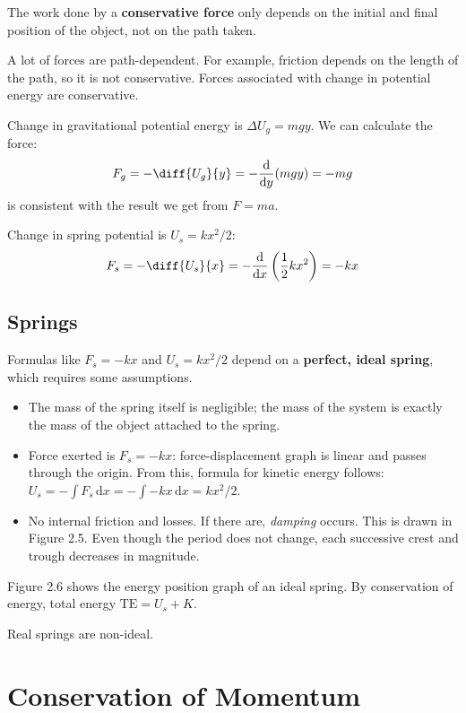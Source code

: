 \documentclass{article}
\newcommand{\definition}[1]{\begin{tcolorbox}[colback=red!5!white,colframe=red!75!black,parbox=false] #1 \end{tcolorbox}}
\newcommand{\example}[2]{\begin{tcolorbox}[title={Example: #1},colback=brown!5!white,colframe=brown!75!black,parbox=false] #2 \end{tcolorbox}}
\newcommand*{\deriv}[1][x]{\ensuremath{\dfrac{\mathrm{d}}{\mathrm{d}#1}}}
\begin{document}
\definition{The work done by a \textbf{conservative force} only depends on the initial and final position of the object, not on the path taken.}

A lot of forces are path-dependent. For example, friction depends on the length of the path, so it is not conservative. Forces associated with change in potential energy are conservative.

\example{Gravitational potential}{
	Change in gravitational potential energy is $\Delta U_g=mgy$. We can calculate the force:
	\begin{equation*}
		F_g=-\diff{U_g}{y}=-\deriv[y](mgy)=-mg
	\end{equation*}
	is consistent with the result we get from $F=ma$.
}

\example{Spring potential}{
	Change in spring potential is $U_s=kx^2/2$:
	\begin{equation*}
		F_s=-\diff{U_s}{x}=-\deriv[x]\left(\frac12kx^2\right)=-kx
	\end{equation*}
}

\subsection{Springs}

Formulas like $F_s=-kx$ and $U_s=kx^2/2$ depend on a \textbf{perfect, ideal spring}, which requires some assumptions.
\begin{itemize}
	\item The mass of the spring itself is negligible; the mass of the system is exactly the mass of the object attached to the spring.
	\item Force exerted is $F_s=-kx$: force-displacement graph is linear and passes through the origin. From this, formula for kinetic energy follows: $U_s=-\int F_s\,\mathrm{d}x=-\int -kx\,\mathrm{d}x=kx^2/2$.
	\item No internal friction and losses. If there are, \textit{damping} occurs. This is drawn in Figure 2.5. Even though the period does not change, each successive crest and trough decreases in magnitude.
\end{itemize}

Figure 2.6 shows the energy position graph of an ideal spring. By conservation of energy, total energy $\text{TE}=U_s+K$.

Real springs are non-ideal.

\section{Conservation of Momentum}
\label{sec:momentum}
\end{document}
